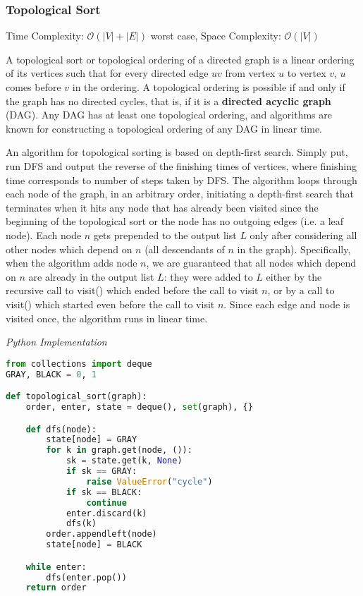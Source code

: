 \documentclass{article}
\newcommand{\bigO}{\ensuremath{\mathcal{O}}}
\begin{document}
    \subsubsection{Topological Sort}
    Time Complexity: $\bigO(|V| + |E|)$ worst case,  Space Complexity: $\bigO(|V|)$
    
    A topological sort or topological ordering of a directed graph is a linear ordering of its vertices such that for every directed edge $uv$ from vertex $u$ to vertex $v$, $u$ comes before $v$ in the ordering. A topological ordering is possible if and only if the graph has no directed cycles, that is, if it is a \textbf{directed acyclic graph} (DAG). Any DAG has at least one topological ordering, and algorithms are known for constructing a topological ordering of any DAG in linear time.
    
    An algorithm for topological sorting is based on depth-first search. Simply put, run DFS and output the reverse of the finishing times of vertices, where finishing time corresponds to number of steps taken by DFS. The algorithm loops through each node of the graph, in an arbitrary order, initiating a depth-first search that terminates when it hits any node that has already been visited since the beginning of the topological sort or the node has no outgoing edges (i.e. a leaf node). Each node $n$ gets prepended to the output list $L$ only after considering all other nodes which depend on $n$ (all descendants of $n$ in the graph). Specifically, when the algorithm adds node $n$, we are guaranteed that all nodes which depend on $n$ are already in the output list $L$: they were added to $L$ either by the recursive call to visit() which ended before the call to visit $n$, or by a call to visit() which started even before the call to visit $n$. Since each edge and node is visited once, the algorithm runs in linear time.

\vspace{8pt} \emph{Python Implementation}
\begin{lstlisting}[language=Python]
from collections import deque
GRAY, BLACK = 0, 1

def topological_sort(graph):
    order, enter, state = deque(), set(graph), {}

    def dfs(node):
        state[node] = GRAY
        for k in graph.get(node, ()):
            sk = state.get(k, None)
            if sk == GRAY:
                raise ValueError("cycle")
            if sk == BLACK:
                continue
            enter.discard(k)
            dfs(k)
        order.appendleft(node)
        state[node] = BLACK

    while enter:
        dfs(enter.pop())
    return order
\end{lstlisting}
\end{document}

